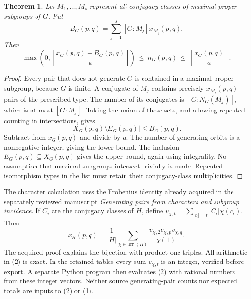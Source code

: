 \documentclass[11pt,a4paper]{article}
\newtheorem{theorem}{Theorem}
\begin{document}
\begin{theorem}\label{union}
Let $M_1,\ldots,M_s$ represent all conjugacy classes of maximal proper
subgroups of $G$. Put
\[
 B_G(p,q)=\sum_{j=1}^s [G:M_j]x_{M_j}(p,q).
\]
Then
\[
 \max\left(0,\left\lceil\frac{x_G(p,q)-B_G(p,q)}a\right\rceil\right)
 \ \le\ n_G(p,q)\ \le\ \left\lfloor\frac{x_G(p,q)}a\right\rfloor. \tag{1}
\]
\end{theorem}
\begin{proof}
Every pair that does not generate $G$ is contained in a maximal proper
subgroup, because $G$ is finite. A conjugate of $M_j$ contains precisely
$x_{M_j}(p,q)$ pairs of the prescribed type. The number of its conjugates
is $[G:N_G(M_j)]$, which is at most $[G:M_j]$. Taking the union of these
sets, and allowing repeated counting in intersections, gives
\[
 |X_G(p,q)\setminus E_G(p,q)|\le B_G(p,q).
\]
Subtract from $x_G(p,q)$ and divide by $a$. The number of generating
orbits is a nonnegative integer, giving the lower bound. The inclusion
$E_G(p,q)\subseteq X_G(p,q)$ gives the upper bound, again using
integrality. No assumption that maximal subgroups intersect trivially
is made. Repeated isomorphism types in the list must retain their
conjugacy-class multiplicities.
\end{proof}

The character calculation uses the Frobenius identity already acquired
in the separately reviewed manuscript \emph{Generating pairs from
characters and subgroup incidence}. If $C_i$ are the conjugacy classes
of $H$, define $v_{\chi,t}=\sum_{|c_i|=t}|C_i|\chi(c_i)$. Then
\[
 x_H(p,q)=\frac1{|H|}\sum_{\chi\in\operatorname{Irr}(H)}
             \frac{v_{\chi,2}v_{\chi,p}v_{\chi,q}}{\chi(1)}. \tag{2}
\]
The acquired proof explains the bijection with product-one triples.
All arithmetic in (2) is exact. In the retained tables every sum
$v_{\chi,t}$ is an integer, verified before export. A separate Python
program then evaluates (2) with rational numbers from these integer
vectors. Neither source generating-pair counts nor expected totals
are inputs to (2) or (1).
\end{document}
